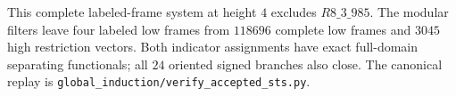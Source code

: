 This complete labeled-frame system at height $4$ excludes
$R8\_3\_985$. The modular filters leave four labeled low frames from
$118696$ complete low frames and $3045$ high restriction vectors.
Both indicator assignments have exact full-domain separating
functionals; all $24$ oriented signed branches also close.
The canonical replay is
\texttt{global\_induction/verify\_accepted\_sts.py}.
